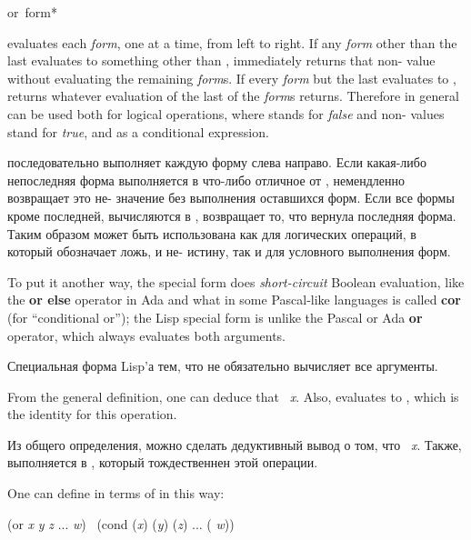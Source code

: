 \begin{defmac}
or {\,form}*

 evaluates each \emph{form}, one at a time,
from left to right.  If any \emph{form} other than the last
evaluates to something other than {\false},
immediately returns that non-{\false} value without evaluating the remaining
\emph{form\/}s.  If every \emph{form} but the last evaluates to {\false},
 returns whatever evaluation of the last of the \emph{form\/}s returns.
Therefore in general  can be used both for logical operations,
where {\false} stands for \emph{false} and non-{\false} values stand for \emph{true},
and as a conditional expression.

 последовательно выполняет каждую
форму слева направо. Если какая-либо непоследняя форма выполняется в что-либо
отличное от {\false},  немендленно возвращает это не-{\false} значение
без выполнения оставшихся форм. Если все формы кроме последней, вычисляются в
{\false},  возвращает то, что вернула последняя форма.
Таким образом  может быть использована как для логических операций, 
в который {\false} обозначает ложь, и не-{\false} истину,
так и для условного выполнения форм.

To put it another way,
the  special form does \emph{short-circuit} Boolean evaluation,
like the \textbf{or else} operator in Ada
and what in some Pascal-like languages is called \textbf{cor} (for ``conditional
or''); the Lisp  special form is
unlike the Pascal or Ada \textbf{or} operator,
which always evaluates both arguments.

Специальная форма Lisp'а  тем, что не обязательно вычисляет все
аргументы. 

From the general definition, one can deduce that
 \EQ\ \emph{x}.  Also,
 evaluates to {\nil}, which is the identity for this operation.

Из общего определения, можно сделать дедуктивный вывод о том, что  \EQ\ \emph{x}. Также,  выполняется в {\nil}, который
тождественнен этой операции.

One can define  in terms of  in this way:
\begin{lisp}
(or \emph{x} \emph{y} \emph{z} ... \emph{w}) \EQ\ (cond (\emph{x}) (\emph{y}) (\emph{z}) ... ({\true} \emph{w}))
\end{lisp}


\end{defmac}

